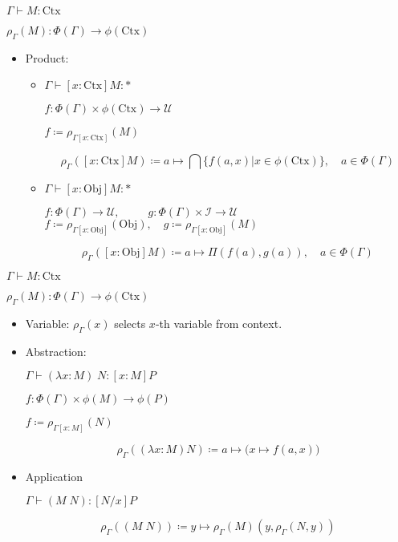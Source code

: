 \documentclass{beamer}
\begin{document}
\begin{frame}{$\Gamma \vdash M : \text{Ctx} $}

$\rho_{\Gamma}(M): \Phi(\Gamma) \rightarrow\phi(\text{Ctx})$

\begin{itemize}
\item Product:
\begin{itemize}
\item $\Gamma \vdash [x: \text{Ctx}] M : * $

$f: \Phi(\Gamma)\times \phi(\text{Ctx})  \rightarrow \mathscr{U}$

$f \coloneqq \rho_{\Gamma [x: \text{Ctx}]}(M)$

$$\rho_{\Gamma}([x: \text{Ctx}] M) \coloneqq a \mapsto \bigcap \{ f(a,x) | x \in \phi(\text{Ctx}) \}, \quad a \in \Phi(\Gamma)$$

\item $\Gamma \vdash [x: \text{Obj}] M : * $


$f : \Phi(\Gamma)\rightarrow \mathscr{U}, \quad \, \, \, \quad g : \Phi(\Gamma) \times \mathscr{I} \rightarrow \mathscr{U}$
$f \coloneqq \rho_{\Gamma[x:\text{Obj}]}(\text{Obj}), \quad g \coloneqq \rho_{\Gamma[x:\text{Obj}]}(M)$

$$\rho_{\Gamma}([x: \text{Obj}] M) \coloneq a \mapsto \Pi(f(a), g(a)), \quad a \in \Phi(\Gamma)$$


\end{itemize}
\end{itemize}


\end{frame}

\begin{frame}{$\Gamma \vdash M : \text{Ctx} $}

$\rho_{\Gamma}(M): \Phi(\Gamma) \rightarrow\phi(\text{Ctx})$

\begin{itemize}
\item Variable: $\rho_{\Gamma}(x)$ selects $x$-th variable from context.
\item Abstraction: 

$\Gamma \vdash (\lambda x: M) \; N : [x:M]P$

$f : \Phi(\Gamma) \times \phi(M) \rightarrow \phi(P)$

$f \coloneqq \rho_{\Gamma[x:M]}(N)$

$$\rho_{\Gamma} ((\lambda x: M) N) \coloneqq a \mapsto \bigg(x \mapsto f(a,x)\bigg)$$

\item Application

$\Gamma \vdash (M \; N) : [N/x] P$

$$\rho_{\Gamma} ((M \; N)) \coloneqq  y \mapsto \rho_{\Gamma}(M)(y, \rho_{\Gamma}(N,y))$$

\end{itemize}

\end{frame}
\end{document}

